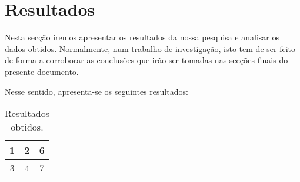 \section{Resultados}\label{sec:resultados}

Nesta secção iremos apresentar os resultados da nossa pesquisa e analisar os dados obtidos.
Normalmente, num trabalho de investigação, isto tem de ser feito de forma a corroborar as conclusões que irão ser tomadas nas secções finais do presente documento.

Nesse sentido, apresenta-se os seguintes resultados:

\begin{table}[htb!]
    \centering
    \caption{Resultados obtidos.}
    \label{tab:tabela1}
    \begin{tabular}{|c|c|c|}
        \hline
        1 & 2 & 6 \\ \hline
        3 & 4 & 7 \\ \hline
    \end{tabular}
\end{table}
